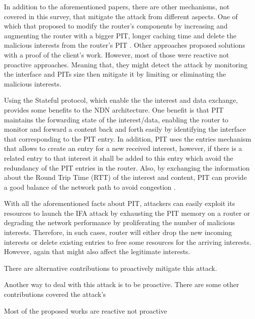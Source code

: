 \documentclass[conference]{IEEEtran}
\begin{document}
In addition to the aforementioned papers, there are other mechanisms, not covered in this survey, that mitigate the attack from different aspects. One of which that proposed to modify the router's components by increasing and augmenting the router with a bigger PIT, longer caching time and delete the malicious interests from the router's PIT \cite{Wang2012}\cite{Virgilio2013}. Other approaches proposed solutions with a proof of the client's work\cite{Li2014}. However, most of those were reactive not proactive approaches. Meaning that, they might detect the attack by monitoring the interface and PITs size then mitigate it by limiting or eliminating the malicious interests.  

Using the Stateful protocol, which enable the the interest and data exchange, provides some benefits to the NDN architecture. One benefit is that PIT maintains the forwarding state of the interest/data, enabling the router to monitor and forward a content back and forth easily by identifying the interface that corresponding to the PIT entry. In addition, PIT uses the entries mechanism that allows to create an entry for a new received interest, however, if there is a related entry to that interest it shall be added to this entry which avoid the redundancy of the PIT entries in the router. Also, by exchanging the information about the Round Trip Time (RTT) of the interest and content, PIT can provide a good balance of the network path to avoid congestion \cite{Yi2012}\cite{Wang2013}. 

With all the aforementioned facts about PIT, attackers can easily exploit its resources to launch the IFA attack by exhausting the PIT memory on a router or degrading the network performance by proliferating the number of malicious interests. Therefore, in such cases, router will either drop the new incoming interests or delete existing entries to free some resources for the arriving interests. However, again that might also affect the legitimate interests.     

There are alternative contributions to proactively mitigate this attack. 

Another way to deal with this attack is to be proactive. There are some other contributions covered the attack's  


\cite{Ghali2015}


Most of the proposed works are reactive not proactive 

\cite{Chen2015}
\cite{Ahlgren2012}
\cite{Universite2018}

\cite{Tourani2018}
\cite{Bhattacharyya2018}
\cite{Chhetry2016}
\end{document}
